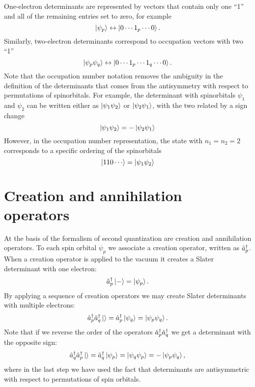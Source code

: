 \documentclass[../Main/chem532-notes.tex]{subfiles}
\begin{document}
One-electron determinants are represented by vectors that contain only one ``1'' and all of the remaining entries set to zero, for example
\begin{equation}
\ket{\psi_p} \leftrightarrow \ket{0 \cdots 1_p \cdots 0}.
\end{equation}
Similarly, two-electron determinants correspond to occupation vectors with two ``1''
\begin{equation}
\ket{\psi_p \psi_q} \leftrightarrow \ket{0 \cdots 1_p \cdots 1_q \cdots 0}.
\end{equation}
Note that the occupation number notation removes the ambiguity in the definition of the determinants that comes from the antisymmetry with respect to permutations of spinorbitals.
For example, the determinant with spinorbitals $\psi_1$ and $\psi_2$ can be written either as $\ket{\psi_1 \psi_2}$ or $\ket{\psi_2 \psi_1}$, with the two related by a sign change
\begin{equation}
\ket{\psi_1 \psi_2} = -\ket{\psi_2 \psi_1}
\end{equation}
However, in the occupation number representation, the state with $n_1 = n_2 = 2$ corresponds to a specific ordering of the spinorbitals
\begin{equation}
\ket{1 1 0 \cdots} = \ket{\psi_1 \psi_2}
\end{equation}

\section{Creation and annihilation operators}

At the basis of the formalism of second quantization are creation and annihilation operators. To each spin orbital $\psi_p$ we associate a creation operator, written as $\hat{a}_{p}^{\dagger}$.
When a creation operator is applied to the vacuum it creates a Slater determinant with one electron:
\begin{equation}
\hat{a}_{p}^{\dagger} \ket{-} = \ket{\psi_p}.
\end{equation}
By applying a sequence of creation operators we may create Slater determinants with multiple electrons:
\begin{equation}
\hat{a}_{p}^{\dagger} \hat{a}_{q}^{\dagger} \ket{} = \hat{a}_{p}^{\dagger} \ket{\psi_q} = \ket{\psi_p \psi_q}.
\end{equation}
Note that if we reverse the order of the operators $\hat{a}_{p}^{\dagger} \hat{a}_{q}^{\dagger}$ we get a determinant with the opposite sign:
\begin{equation}
\hat{a}_{q}^{\dagger} \hat{a}_{p}^{\dagger} \ket{} = \hat{a}_{q}^{\dagger} \ket{\psi_p} = \ket{\psi_q \psi_p} = -\ket{\psi_p \psi_q},
\end{equation}
where in the last step we have used the fact that determinants are antisymmetric with respect to permutations of spin orbitals.
\end{document}
